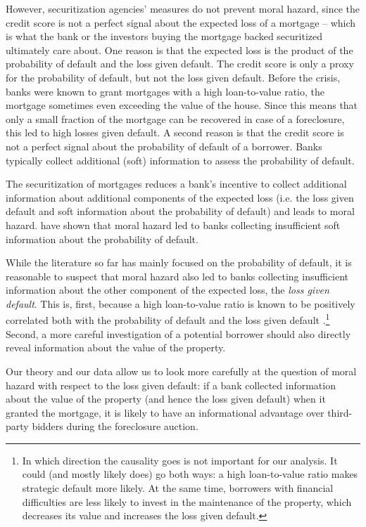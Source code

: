 \documentclass[11pt,twopage]{article}
\begin{document}
However, securitization agencies' measures do not prevent moral hazard, since the credit score is not a perfect signal about the expected loss of a mortgage -- which is what the bank or the investors buying the mortgage backed securitized ultimately care about. One reason is that the expected loss is the product of the probability of default and the loss given default. The credit score is only a proxy for the probability of default, but not the loss given default. Before the crisis, banks were known to grant mortgages with a high loan-to-value ratio, the mortgage sometimes even exceeding the value of the house. Since this means that only a small fraction of the mortgage can be recovered in case of a foreclosure, this led to high losses given default. A second reason is that the credit score is not a perfect signal about the probability of default of a borrower. Banks typically collect additional (soft) information to assess the probability of default.

The securitization of mortgages reduces a bank's incentive to collect additional information about additional components of the expected loss (i.e. the loss given default and soft information about the probability of default) and leads to moral hazard. \cite{keys2008did} have shown that moral hazard led to banks collecting insufficient soft information about the probability of default.

While the literature so far has mainly focused on the probability of default, it is reasonable to suspect that moral hazard also led to banks collecting insufficient information about the other component of the expected loss, the \emph{loss given default}. This is, first, because a high loan-to-value ratio is known to be positively correlated both with the probability of default and the loss given default \citep[see][and the references therein]{qi2009loss}.\footnote{In which direction the causality goes is not important for our analysis. It could (and mostly likely does) go both ways: a high loan-to-value ratio makes strategic default more likely. At the same time, borrowers with financial difficulties are less likely to invest in the maintenance of the property, which decreases its value and increases the loss given default.} Second, a more careful investigation of a potential borrower should also directly reveal information about the value of the property.

Our theory and our data allow us to look more carefully at the question of moral hazard with respect to the loss given default: if a bank collected information about the value of the property (and hence the loss given default) when it granted the mortgage, it is likely to have an informational advantage over third-party bidders during the foreclosure auction.
\end{document}
